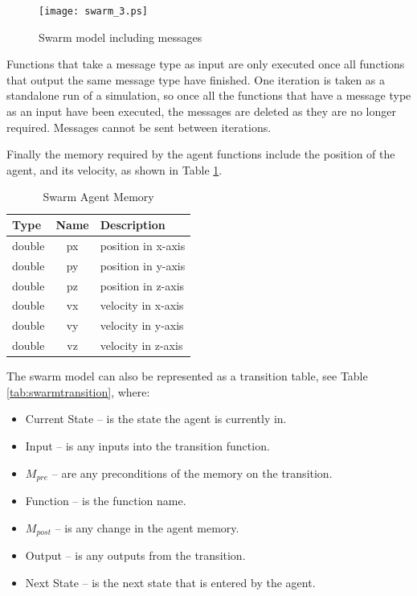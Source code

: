 \begin{figure}[ht]
\begin{center}
\texttt{[image: swarm\_3.ps]}
\caption{Swarm model including messages}
\label{fig:swarm_3}
\end{center}
\end{figure}

Functions that take a message type as input are only executed once all functions
that output the same message type have finished. One iteration is taken as a
standalone run of a simulation, so once all the functions that have a message
type as an input have been executed, the messages are deleted as they are no
longer required. Messages cannot be sent between iterations.

Finally the memory required by the agent functions include the position of the
agent, and its velocity, as shown in Table \ref{tab:swarm_memory}.

\begin{table}[ht]
\centering
\begin{tabular}{|l||c||l|}
\hline
Type&Name&Description\\
\hline \hline
double&px&position in x-axis\\
\hline
double&py&position in y-axis\\
\hline
double&pz&position in z-axis\\
\hline
double&vx&velocity in x-axis\\
\hline
double&vy&velocity in y-axis\\
\hline
double&vz&velocity in z-axis\\
\hline
\end{tabular}
\caption{Swarm Agent Memory}
\label{tab:swarm_memory}
\end{table}

The swarm model can also be represented as a transition table, see Table
\ref{tab:swarmtransition}, where:

\begin{itemize}
  \item Current State -- is the state the agent is currently in.
  \item Input -- is any inputs into the transition function.
  \item $M_{pre}$ -- are any preconditions of the memory on the transition.
  \item Function -- is the function name.
  \item $M_{post}$ -- is any change in the agent memory.
  \item Output -- is any outputs from the transition.
  \item Next State -- is the next state that is entered by the agent.
\end{itemize}

